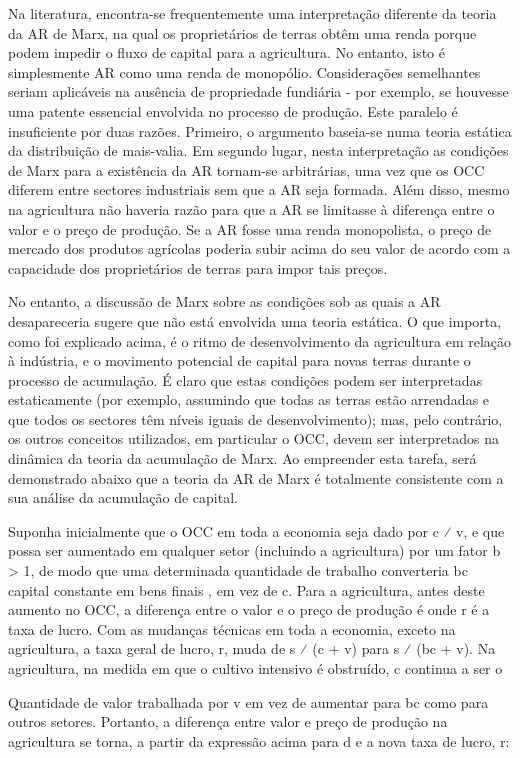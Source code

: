  \par 
Na literatura, encontra-se frequentemente uma interpretação diferente da teoria da AR de Marx, na qual os proprietários de terras obtêm uma renda porque podem impedir o fluxo de capital para a agricultura. No entanto, isto é simplesmente AR como uma renda de monopólio. Considerações semelhantes seriam aplicáveis ​​na ausência de propriedade fundiária - por exemplo, se houvesse uma patente essencial envolvida no processo de produção. Este paralelo é insuficiente por duas razões. Primeiro, o argumento baseia-se numa teoria estática da distribuição de mais-valia. Em segundo lugar, nesta interpretação as condições de Marx para a existência da AR tornam-se arbitrárias, uma vez que os OCC diferem entre sectores industriais sem que a AR seja formada. Além disso, mesmo na agricultura não haveria razão para que a AR se limitasse à diferença entre o valor e o preço de produção. Se a AR fosse uma renda monopolista, o preço de mercado dos produtos agrícolas poderia subir acima do seu valor de acordo com a capacidade dos proprietários de terras para impor tais preços.
 \par 
No entanto, a discussão de Marx sobre as condições sob as quais a AR desapareceria sugere que não está envolvida uma teoria estática. O que importa, como foi explicado acima, é o ritmo de desenvolvimento da agricultura em relação à indústria, e o movimento potencial de capital para novas terras durante o processo de acumulação. É claro que estas condições podem ser interpretadas estaticamente (por exemplo, assumindo que todas as terras estão arrendadas e que todos os sectores têm níveis iguais de desenvolvimento); mas, pelo contrário, os outros conceitos utilizados, em particular o OCC, devem ser interpretados na dinâmica da teoria da acumulação de Marx. Ao empreender esta tarefa, será demonstrado abaixo que a teoria da AR de Marx é totalmente consistente com a sua análise da acumulação de capital.
 \par 
Suponha inicialmente que o OCC em toda a economia seja dado por c ⁄ v, e que possa ser aumentado em qualquer setor (incluindo a agricultura) por um fator b > 1, de modo que uma determinada quantidade de trabalho converteria bc capital constante em bens finais , em vez de c. Para a agricultura, antes deste aumento no OCC, a diferença entre o valor e o preço de produção é onde r é a taxa de lucro. Com as mudanças técnicas em toda a economia, exceto na agricultura, a taxa geral de lucro, r, muda de s ⁄ (c + v) para s ⁄ (bc + v). Na agricultura, na medida em que o cultivo intensivo é obstruído, c continua a ser o
 \par 
Quantidade de valor trabalhada por v em vez de aumentar para bc como para outros setores. Portanto, a diferença entre valor e preço de produção na agricultura se torna, a partir da expressão acima para d e a nova taxa de lucro, r:
 \par 
